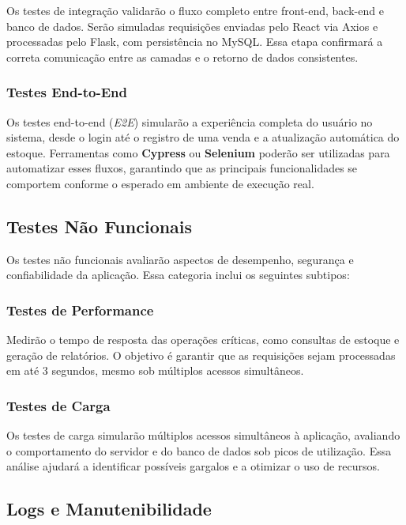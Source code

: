 Os testes de integração validarão o fluxo completo entre front-end, back-end e banco de dados. Serão simuladas requisições enviadas pelo React via Axios e processadas pelo Flask, com persistência no MySQL. Essa etapa confirmará a correta comunicação entre as camadas e o retorno de dados consistentes.

\subsubsection{Testes End-to-End}

Os testes end-to-end (\textit{E2E}) simularão a experiência completa do usuário no sistema, desde o login até o registro de uma venda e a atualização automática do estoque. Ferramentas como \textbf{Cypress} ou \textbf{Selenium} poderão ser utilizadas para automatizar esses fluxos, garantindo que as principais funcionalidades se comportem conforme o esperado em ambiente de execução real.

\subsection{Testes Não Funcionais}

Os testes não funcionais avaliarão aspectos de desempenho, segurança e confiabilidade da aplicação. Essa categoria inclui os seguintes subtipos:

\subsubsection{Testes de Performance}

Medirão o tempo de resposta das operações críticas, como consultas de estoque e geração de relatórios. O objetivo é garantir que as requisições sejam processadas em até 3 segundos, mesmo sob múltiplos acessos simultâneos.

\subsubsection{Testes de Carga}

Os testes de carga simularão múltiplos acessos simultâneos à aplicação, avaliando o comportamento do servidor e do banco de dados sob picos de utilização. Essa análise ajudará a identificar possíveis gargalos e a otimizar o uso de recursos.

\subsection{Logs e Manutenibilidade}

